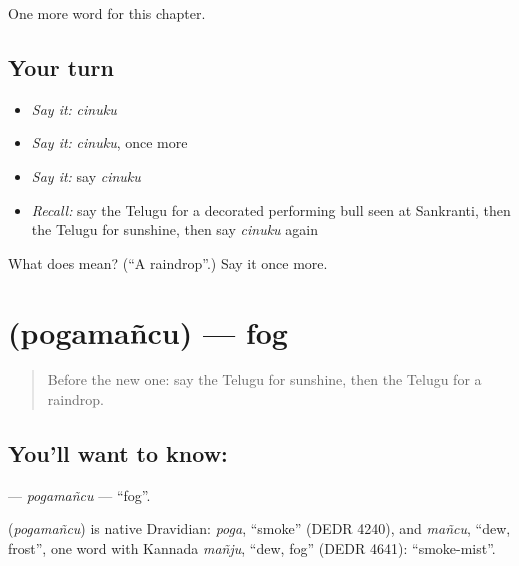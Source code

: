 \begin{grammarlens}[title={What you've built}]
One more word for this chapter.
\end{grammarlens}

\subsection*{Your turn}
\begin{itemize}
\raggedright
  \item \emph{Say it:} \emph{cinuku}
  \item \emph{Say it:} \emph{cinuku}, once more
  \item \emph{Say it:} say \emph{cinuku}
  \item \emph{Recall:} say the Telugu for a decorated performing bull seen at Sankranti, then the Telugu for sunshine, then say \emph{cinuku} again
\end{itemize}

\begin{tcolorbox}[breakable,colback=teal!4,colframe=teal!35!black,title={Before you move on}]
What does  mean? (\textquotedblleft{}A raindrop\textquotedblright{}.) Say it once more.
\end{tcolorbox}
\section[\texorpdfstring{\te{పొగమంచు} (pogamañcu)}{పొగమంచు (pogamañcu)}]{ (pogamañcu) — fog}

\label{lesson:TE-C229-pogamancu}



\begin{quote}
Before the new one: say the Telugu for sunshine, then the Telugu for a raindrop.
\end{quote}

\subsection*{You'll want to know: }
\textbf{} — \emph{pogamañcu} — \textquotedblleft{}fog\textquotedblright{}.

\begin{cousinweb}
\textbf{} (\emph{pogamañcu}) is native Dravidian: \emph{poga}, \textquotedblleft{}smoke\textquotedblright{} (DEDR 4240), and \emph{mañcu}, \textquotedblleft{}dew, frost\textquotedblright{}, one word with Kannada \emph{mañju}, \textquotedblleft{}dew, fog\textquotedblright{} (DEDR 4641): \textquotedblleft{}smoke-mist\textquotedblright{}.
\end{cousinweb}

